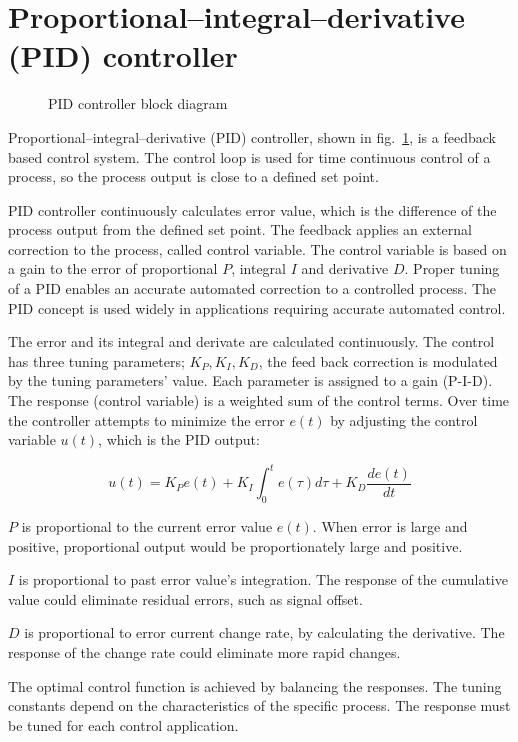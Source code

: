 \documentclass[\main/master.tex]{subfiles}
\begin{document}
\section{Proportional–integral–derivative (PID) controller}
\begin{figure}[htbp]
	\centering
	\caption[PID controller block diagram]{PID controller block diagram}
	\label{fig:PID_scheme}
\end{figure}
\FloatBarrier
\par\noindent
Proportional–integral–derivative (PID) controller, shown in fig.~\ref{fig:PID_scheme}, is a feedback based control system. The control loop is used for time continuous control of a process, so the process output is close to a defined set point.
\par\noindent
PID controller continuously calculates error value, which is the difference of the process output from the defined set point. The feedback applies an external correction to the process, called control variable. The control variable is based on a gain to the error of proportional $P$, integral $I$ and derivative $D$. Proper tuning of a PID enables an accurate automated correction to a controlled process. The PID concept is used widely in applications requiring accurate automated control.

\par\noindent
The error and its integral and derivate are calculated continuously. The control has three tuning parameters; $K_P, K_I, K_D$, the feed back correction is modulated by the tuning parameters' value. Each parameter is assigned to a gain (P-I-D). The response (control variable) is a weighted sum of the control terms. Over time the controller attempts to minimize the error $e(t)$ by adjusting the control variable $u(t)$, which is the PID output:
\par\noindent

\begin{equation}
u(t) = K_P e(t)+K_I\int_{0}^{t}e(\tau)d\tau+K_D\frac{de(t)}{dt}   \label{eqn:PID response}
\end{equation}

\noindent
$P$ is proportional to the current error value $e(t)$. When error is large and positive, proportional output would be proportionately large and positive.
\par\noindent
$I$ is proportional to past error value's integration. The response of the cumulative value could eliminate residual errors, such as signal offset.
\par\noindent
$D$ is proportional to error current change rate, by calculating the derivative. The response of the change rate could eliminate more rapid changes.
\par\noindent
The optimal control function is achieved by balancing the responses. The tuning constants depend on the characteristics of the specific process. The response must be tuned for each control application.  
\end{document}
